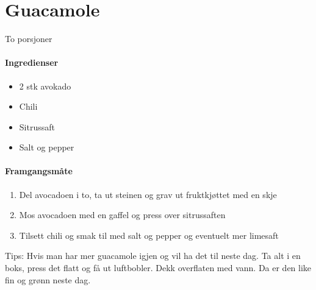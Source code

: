 \section{﻿Guacamole}
\label{guacamole}
To porsjoner

\paragraph{Ingredienser}
\begin{itemize}[noitemsep]
	\item 2 stk avokado
	\item Chili
	\item Sitrussaft
	\item Salt og pepper
\end{itemize}


\paragraph{Framgangsmåte}
\begin{enumerate}[noitemsep]
	\item Del avocadoen i to, ta ut steinen og grav ut fruktkjøttet med en skje
	\item Mos avocadoen med en gaffel og press over sitrussaften
	\item Tilsett chili og smak til med salt og pepper og eventuelt mer limesaft
\end{enumerate}


Tips: Hvis man har mer guacamole igjen og vil ha det til neste dag. Ta alt i en boks, press det flatt og få ut luftbobler. Dekk overflaten med vann. Da er den like fin og grønn neste dag.
